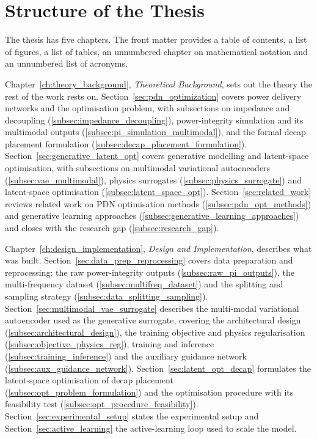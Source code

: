 
\section{Structure of the Thesis}
\label{sec:thesis_structure}

The thesis has five chapters. The front matter provides a table of contents, a list of figures, a
list of tables, an unnumbered chapter on mathematical notation and an unnumbered list of acronyms.

Chapter~\ref{ch:theory_background}, \emph{Theoretical Background}, sets out the theory the rest of
the work rests on. Section~\ref{sec:pdn_optimization} covers power delivery networks and the
optimisation problem, with subsections on impedance and decoupling
(\ref{subsec:impedance_decoupling}), power-integrity simulation and its multimodal outputs
(\ref{subsec:pi_simulation_multimodal}), and the formal decap placement formulation
(\ref{subsec:decap_placement_formulation}). Section~\ref{sec:generative_latent_opt} covers
generative modelling and latent-space optimisation, with subsections on multimodal variational
autoencoders (\ref{subsec:vae_multimodal}), physics surrogates (\ref{subsec:physics_surrogate})
and latent-space optimisation (\ref{subsec:latent_space_opt}).
Section~\ref{sec:related_work} reviews related work on PDN optimisation methods
(\ref{subsec:pdn_opt_methods}) and generative learning approaches
(\ref{subsec:generative_learning_approaches}) and closes with the research gap
(\ref{subsec:research_gap}).

Chapter~\ref{ch:design_implementation}, \emph{Design and Implementation}, describes what was built.
Section~\ref{sec:data_prep_reprocessing} covers data preparation and reprocessing: the raw
power-integrity outputs (\ref{subsec:raw_pi_outputs}), the multi-frequency dataset
(\ref{subsec:multifreq_dataset}) and the splitting and sampling strategy
(\ref{subsec:data_splitting_sampling}). Section~\ref{sec:multimodal_vae_surrogate} describes the
multi-modal variational autoencoder used as the generative surrogate, covering the architectural
design (\ref{subsec:architectural_design}), the training objective and physics regularisation
(\ref{subsec:objective_physics_reg}), training and inference (\ref{subsec:training_inference}) and
the auxiliary guidance network (\ref{subsec:aux_guidance_network}).
Section~\ref{sec:latent_opt_decap} formulates the latent-space optimisation of decap placement
(\ref{subsec:opt_problem_formulation}) and the optimisation procedure with its feasibility test
(\ref{subsec:opt_procedure_feasibility}). Section~\ref{sec:experimental_setup} states the
experimental setup and Section~\ref{sec:active_learning} the active-learning loop used to scale the
model.


